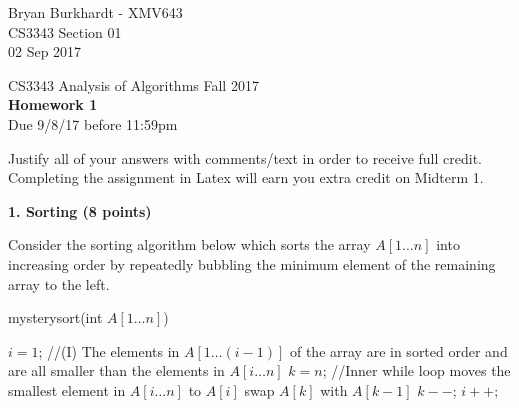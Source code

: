 \documentclass[12pt]{elsart}
\begin{document}
\pagestyle{empty}
Bryan Burkhardt - XMV643\\
CS3343 Section 01\\
02 Sep 2017\\

\begin{center}
\Large  CS3343 Analysis of Algorithms Fall 2017 \\
\large {\bf Homework 1}\\
\normalsize Due 9/8/17 before 11:59pm
\end{center}

Justify all of your answers with comments/text in order to receive full credit.  Completing the assignment in Latex will earn you extra credit on Midterm 1.

{\bf 1. Sorting (8 points)}

Consider the sorting algorithm below which
sorts the array $A[1\ldots n]$ into increasing order by repeatedly bubbling the
minimum element of the remaining array to the left.

\begin{algorithm}
\caption{mysterysort(int $A[1\ldots n]$)}
 \begin{algorithmic}
 \State $i = 1$;
 \State //(I) The elements in $A[1 \ldots (i-1)]$  of the array are in sorted order and are all smaller than the elements in $A[i \ldots n]$
    \State $k = n$;
	\State //Inner while loop moves the smallest element in $A[i \ldots n]$ to $A[i]$
              \State swap $A[k]$ with $A[k-1]$
          \EndIf
       \State $k--$;
     \EndWhile
    \State $i++$;
  \EndWhile
\end{algorithmic}
\end{algorithm}
\end{document}
